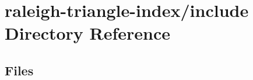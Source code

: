 \section{raleigh-\/triangle-\/index/include Directory Reference}
\label{dir_60e6d35730f6dc494980ca58b2ea2efd}
\subsection*{Files}
\begin{DoxyCompactItemize}
\end{DoxyCompactItemize}

